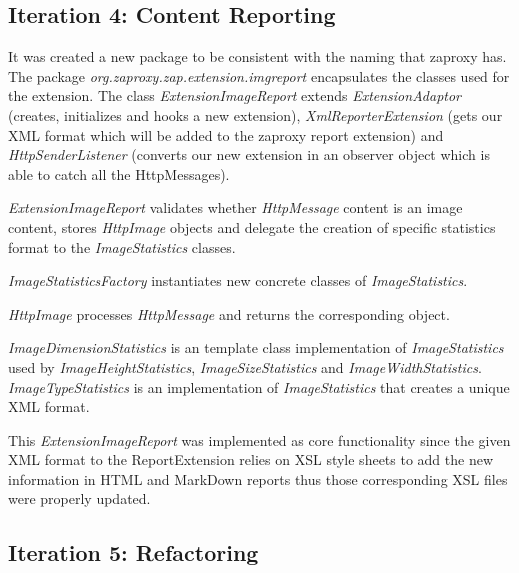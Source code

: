 \subsection{Iteration 4: Content Reporting}
It was created a new package to be consistent with the naming that zaproxy has. The package \textit{org.zaproxy.zap.extension.imgreport} encapsulates the classes used for the extension. The class \textit{ExtensionImageReport} extends \textit{ExtensionAdaptor} (creates, initializes and hooks a new extension), \textit{XmlReporterExtension} (gets our XML format which will be added to the zaproxy report extension) and \textit{HttpSenderListener} (converts our new extension in an observer object which is able to catch all the HttpMessages).
\par
\textit{ExtensionImageReport} validates whether \textit{HttpMessage} content is an image content, stores \textit{HttpImage} objects and delegate the creation of specific statistics format to the \textit{ImageStatistics} classes. 
\par
\textit{ImageStatisticsFactory} instantiates new concrete classes of \textit{ImageStatistics}.
\par
\textit{HttpImage} processes \textit{HttpMessage} and returns the corresponding object.
\par
\textit{ImageDimensionStatistics} is an template class implementation of \textit{ImageStatistics} used by \textit{ImageHeightStatistics}, \textit{ImageSizeStatistics} and \textit{ImageWidthStatistics}. \textit{ImageTypeStatistics} is an implementation of \textit{ImageStatistics} that creates a unique XML format.
\par
This \textit{ExtensionImageReport} was implemented as core functionality since the given XML format to the ReportExtension relies on XSL style sheets to add the new information in HTML and MarkDown reports thus those corresponding XSL files were properly updated.

\subsection{Iteration 5: Refactoring}
